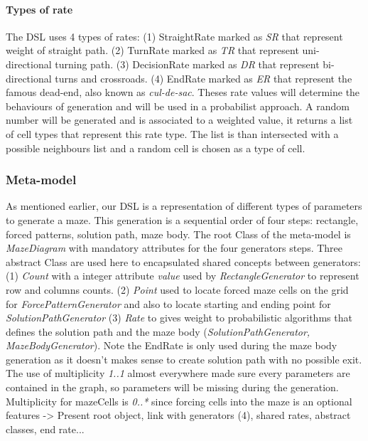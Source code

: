 \documentclass[review]{elsarticle}
\begin{document}
\paragraph{Types of rate}
The DSL uses 4 types of rates: (1) StraightRate marked as \textit{SR} that represent weight of straight path. (2) TurnRate marked as \textit{TR} that represent uni-directional turning path. (3) DecisionRate marked as \textit{DR} that represent bi-directional turns and crossroads. (4) EndRate marked as \textit{ER} that represent the famous dead-end, also known as  \textit{cul-de-sac}. Theses rate values will determine the behaviours of generation and will be used in a probabilist approach. A random number will be generated and is associated to a weighted value, it returns a list of cell types that represent this rate type. The list is than intersected with a possible neighbours list and a random cell is chosen as a type of cell.

\subsubsection{Meta-model}
As mentioned earlier, our DSL is a representation of different types of parameters to generate a maze. This generation is a sequential order of four steps: rectangle, forced patterns, solution path, maze body. The root Class of the meta-model is \textit{MazeDiagram} with mandatory attributes for the four generators steps. Three abstract Class are used here to encapsulated shared concepts between generators: (1) \textit{Count} with a integer attribute \textit{value} used by \textit{RectangleGenerator} to represent row and columns counts. (2) \textit{Point} used to locate forced maze cells on the grid for \textit{ForcePatternGenerator} and also to locate starting and ending point for \textit{SolutionPathGenerator} (3) \textit{Rate} to gives weight to probabilistic algorithms that defines the solution path and the maze body (\textit{SolutionPathGenerator, MazeBodyGenerator}). Note the EndRate is only used during the maze body generation as it doesn't makes sense to create solution path with no possible exit. The use of multiplicity \textit{1..1} almost everywhere made sure every parameters are contained in the graph, so parameters will be missing during the generation. Multiplicity for mazeCells is \textit{0..*} since forcing cells into the maze is an optional features
-> Present root object, link with generators (4), shared rates, abstract classes, end rate...
\end{document}
